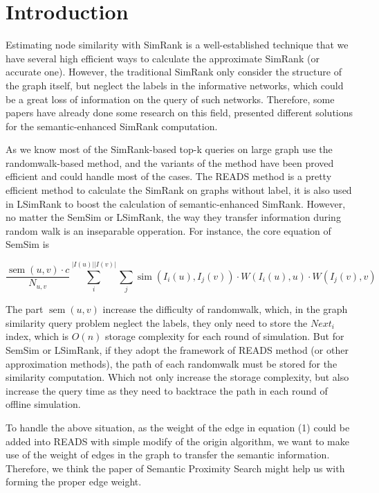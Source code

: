 \documentclass[a4paper, 12pt]{article} %
\begin{document}
\section{Introduction}
    
    Estimating node similarity with SimRank is a well-established technique that we have several high efficient ways to calculate the approximate SimRank (or accurate one). However, the traditional SimRank only consider the structure of the graph itself, but neglect the labels in the informative networks, which could be a great loss of information on the query of such networks. Therefore, some papers have already done some research on this field, presented different solutions for the semantic-enhanced SimRank computation.
    
    As we know most of the SimRank-based top-k queries on large graph use the randomwalk-based method, and the variants of the method have been proved efficient and could handle most of the cases. The READS method is a pretty efficient method to calculate the SimRank on graphs without label, it is also used in LSimRank to boost the calculation of semantic-enhanced SimRank. However, no matter the SemSim or LSimRank, the way they transfer information during random walk is an inseparable opperation. For instance, the core equation of SemSim is 
    
    \begin{equation}
        \frac{\operatorname{sem}(u, v) \cdot c}{N_{u, v}} \sum_{i}^{|I(u)||I(v)|} \sum_{j} \operatorname{sim}\left(I_{i}(u), I_{j}(v)\right) \cdot W\left(I_{i}(u), u\right) \cdot W\left(I_{j}(v), v\right)
    \end{equation}
    
    The part $\operatorname{sem}(u, v)$ increase the difficulty of randomwalk, which, in the graph similarity query problem neglect the labels, they only need to store the $Next_i$ index, which is $O(n)$ storage complexity for each round of simulation. But for SemSim or LSimRank, if they adopt the framework of READS method (or other approximation methods), the path of each randomwalk must be stored for the similarity computation. Which not only increase the storage complexity, but also increase the query time as they need to backtrace the path in each round of offline simulation.
    
    To handle the above situation, as the weight of the edge in equation (1) could be added into READS with simple modify of the origin algorithm, we want to make use of the weight of edges in the graph to transfer the semantic information. Therefore, we think the paper of Semantic Proximity Search might help us with forming the proper edge weight.
\end{document}
